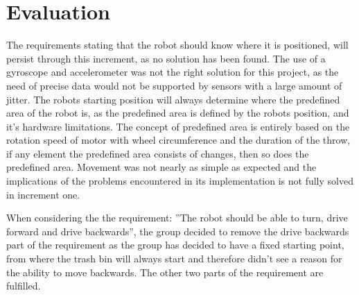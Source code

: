 \section{Evaluation}
\label{sec:i1Evaluation}
The requirements stating that the robot should know where it is positioned, will persist through this increment, as no solution has been found. The use of a gyroscope and accelerometer was not the right solution for this project, as the need of precise data would not be supported by sensors with a large amount of jitter. The robots starting position will always determine where the predefined area of the robot is, as the predefined area is defined by the robots position, and it's hardware limitations. The concept of predefined area is entirely based on the rotation speed of motor with wheel circumference and the duration of the throw, if any element the predefined area consists of changes, then so does the predefined area. Movement was not nearly as simple as expected and the implications of the problems encountered in its implementation is not fully solved in increment one.

When considering the the requirement: ”The robot should be able to turn, drive forward and drive backwards”, the group decided to remove the drive backwards part of the requirement as the group has decided to have a fixed starting point, from where the trash bin will always start and therefore didn’t see a reason for the ability to move backwards.
The other two parts of the requirement are fulfilled.


